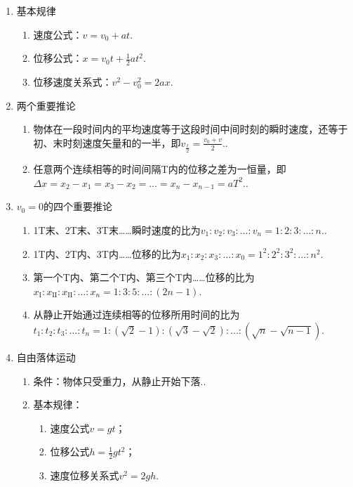 \documentclass[cn,11pt]{elegantbook}
\begin{document}
   \begin{enumerate}
      \item 基本规律
      \begin{enumerate}
         \item 速度公式：$v=v_{0}+a t$.
         \item 位移公式：$x=v_{0} t+\frac{1}{2} a t^2$.
         \item 位移速度关系式：$v^{2}-v_{0}^{2}=2 a x$.
      \end{enumerate}
      \item 两个重要推论
      \begin{enumerate}
         \item 物体在一段时间内的平均速度等于这段时间中间时刻的瞬时速度，还等于初、末时刻速度矢量和的一半，即$v_{\frac{t}{2}}=\frac{v_{0}+v}{2}$..
         \item 任意两个连续相等的时间间隔T内的位移之差为一恒量，即$\Delta x=x_{2}-x_{1}=x_{3}-x_{2}=\ldots=x_{n}-x_{n-1}=a T^{2}$..
      \end{enumerate}
      \item $v_{0}=0$的四个重要推论
      \begin{enumerate}
         \item 1T末、2T末、3T末……瞬时速度的比为$v_{1} : v_{2} : v_{3} : \ldots : v_{n}=1 : 2 : 3 : \ldots : n$..
         \item 1T内、2T内、3T内……位移的比为$x_{1} : x_{2} : x_{3} : \ldots : x_{0}=1^{2} : 2^{2} : 3^{2} : \ldots : n^{2}$.
         \item 第一个T内、第二个T内、第三个T内……位移的比为$x_{\mathrm{I}} : x_{\mathrm{II}} : x_{\mathrm{II}} : \ldots : x_{n}=1 : 3 : 5 : \ldots :(2 n-1)$.
         \item 从静止开始通过连续相等的位移所用时间的比为$t_{1} : t_{2} : t_{3} : \ldots : t_{n}=1 :(\sqrt{2}-1) :(\sqrt{3}-\sqrt{2}) : \ldots :(\sqrt{n}-\sqrt{n-1})$.  
      \end{enumerate}
      \item 自由落体运动
      \begin{enumerate}
         \item 条件：物体只受重力，从静止开始下落..
         \item 基本规律：
         \begin{enumerate}
            \item 速度公式$v=g t$；
            \item 位移公式$h=\frac{1}{2} g t^{2}$；
            \item 速度位移关系式$v^{2}=2 g h$.

\end{enumerate}
\end{enumerate}
\end{enumerate}
\end{document}
